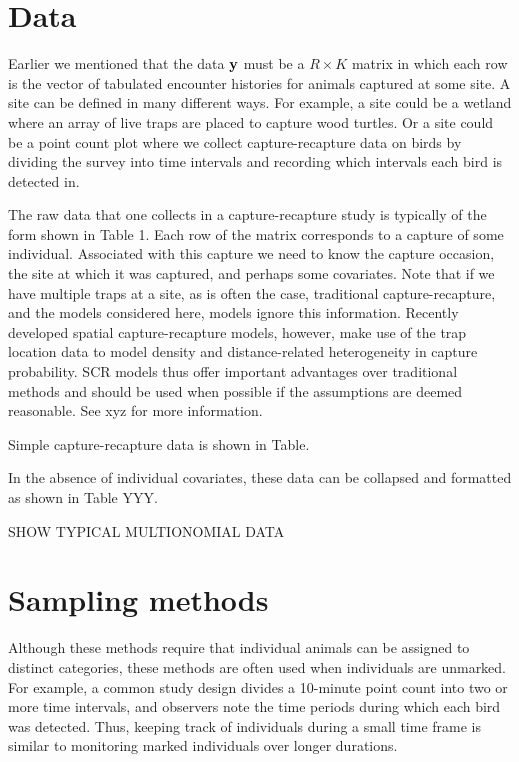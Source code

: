 \documentclass[a4paper]{article}
\begin{document}
\section{Data}
Earlier we mentioned that the data $\bf y$ must be a $R \times K$
matrix in which each row is the vector of tabulated encounter
histories for animals captured at some site. A site can be defined in
many different ways. For example, a site could be a wetland where an
array of live traps are placed to capture wood turtles. Or a site could be
a point count plot where we collect capture-recapture data on birds by
dividing the survey into time intervals and recording which intervals
each bird is detected in.

The raw data that one collects in a
capture-recapture study is typically of the form shown in Table 1. Each row of the
matrix corresponds to a capture of some individual. Associated with
this capture we need to know the capture occasion, the site at which
it was captured, and perhaps some covariates. Note that if we have
multiple traps at a site, as is often the case, traditional
capture-recapture, and the models considered here, models ignore this
information. Recently developed spatial capture-recapture models,
however, make use of the trap location data to model density and
distance-related heterogeneity in capture probability. SCR models thus
offer important advantages over traditional methods and should be used
when possible if the assumptions are deemed reasonable. See xyz for
more information.

Simple capture-recapture data is shown in Table.


In the absence of individual covariates, these data can be collapsed
and formatted as shown in Table YYY.

SHOW TYPICAL MULTIONOMIAL DATA










\section{Sampling methods}



Although these methods require that individual animals can
be assigned to distinct categories, these methods are often used when individuals are
unmarked. For example, a common study design divides a 10-minute
point count into two or more time intervals, and observers note the
time periods during which each bird was detected. Thus, keeping
track of individuals during a small time frame is similar to
monitoring marked individuals over longer durations.
\end{document}

